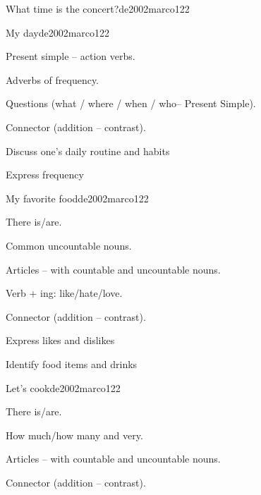 \begin{syllabus}
\begin{unit}{What time is the concert?}{}{de2002marco}{12}{2}
\end{unit}
\begin{unit}{My day}{}{de2002marco}{12}{2}
   \begin{topics}
      \item Present simple – action verbs.
      \item Adverbs of frequency.
      \item Questions (what / where / when / who– Present Simple).
      \item Connector (addition – contrast).
   \end{topics}

   \begin{learningoutcomes}
      \item Discuss one’s daily routine and habits
      \item Express frequency
   \end{learningoutcomes}
\end{unit}

\begin{unit}{My favorite food}{}{de2002marco}{12}{2}
   \begin{topics}
      \item There is/are.
      \item Common uncountable nouns.
      \item Articles – with countable and uncountable nouns.
      \item Verb + ing: like/hate/love.
      \item Connector (addition – contrast).
   \end{topics}

   \begin{learningoutcomes}
      \item Express likes and dislikes
      \item Identify food items and drinks
   \end{learningoutcomes}

\end{unit}

\begin{unit}{Let's cook}{}{de2002marco}{12}{2}
   \begin{topics}
      \item There is/are.
      \item How much/how many and very.
      \item Articles – with countable and uncountable nouns.
      \item Connector (addition – contrast).
   \end{topics}


\end{unit}
\end{syllabus}
